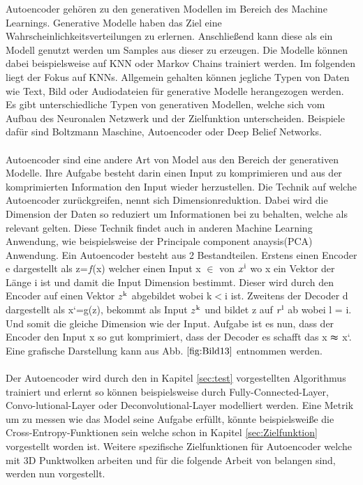 \documentclass{llncs}
\begin{document}
Autoencoder gehören zu den generativen Modellen im Bereich des Machine Learnings. Generative Modelle haben das Ziel eine Wahrscheinlichkeitsverteilungen zu erlernen. Anschließend kann diese als ein Modell genutzt werden um Samples aus dieser zu erzeugen. Die Modelle können dabei beispielsweise auf KNN oder Markov Chains trainiert werden. Im folgenden liegt der Fokus auf KNNs. Allgemein gehalten können jegliche Typen von Daten wie Text, Bild oder Audiodateien für generative Modelle herangezogen werden. Es gibt unterschiedliche Typen von generativen Modellen, welche sich vom Aufbau des Neuronalen Netzwerk und der Zielfunktion unterscheiden. Beispiele dafür sind Boltzmann Maschine, Autoencoder oder Deep Belief Networks\cite{Grundlagen}. 
\\\\
Autoencoder sind eine andere Art von Model aus den Bereich der generativen Modelle. Ihre Aufgabe besteht darin einen Input zu komprimieren und aus der komprimierten Information den Input wieder herzustellen. Die Technik auf welche Autoencoder zurückgreifen, nennt sich Dimensionreduktion. Dabei wird die Dimension der Daten so reduziert um Informationen bei zu behalten, welche als relevant gelten. Diese Technik findet auch in anderen Machine Learning Anwendung, wie beispielsweise der Principale component anaysis(PCA) Anwendung\cite{dimreduction}.  Ein Autoencoder besteht aus 2 Bestandteilen. Erstens einen Encoder e dargestellt als z=$f$(x) welcher einen Input x $\in$ von $x\textsuperscript{i}$ wo x ein Vektor der Länge i ist und damit die Input Dimension bestimmt. Dieser wird durch den Encoder auf einen Vektor $z\textsuperscript{k}$ abgebildet wobei k$<$i ist. Zweitens der Decoder d dargestellt als x`=g(z), bekommt als Input $z\textsuperscript{k}$ und bildet z auf $r\textsuperscript{l}$ ab wobei l = i. Und somit die gleiche Dimension wie der Input. Aufgabe ist es nun, dass der Encoder den Input x so gut komprimiert, dass der Decoder es schafft das x $\thickapprox$ x`. Eine grafische Darstellung kann aus Abb. $\ref{fig:Bild13}$ entnommen werden\cite{Grundlagen}. 
\\\\
Der Autoencoder wird durch den in Kapitel \ref{sec:test} vorgestellten Algorithmus trainiert und erlernt so können beispielsweise durch Fully-Connected-Layer,  Convo-lutional-Layer oder Deconvolutional-Layer modelliert werden. Eine Metrik um zu messen wie das Model seine Aufgabe erfüllt, könnte beispielsweiße die Cross-Entropy-Funktionen sein welche schon in Kapitel \ref{sec:Zielfunktion} vorgestellt worden ist. Weitere spezifische Zielfunktionen für Autoencoder welche mit 3D Punktwolken arbeiten und für die folgende Arbeit von belangen sind, werden nun vorgestellt.
\end{document}
